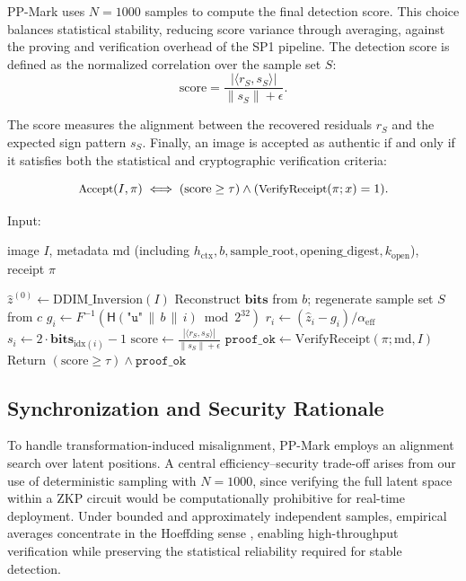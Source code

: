 \documentclass{article}
\theoremstyle{plain}
\theoremstyle{definition}
\theoremstyle{remark}
\begin{document}
PP-Mark uses \(N = 1000\) samples to compute the final detection score. This choice balances
statistical stability, reducing score variance through averaging, against the proving and
verification overhead of the SP1 pipeline. The detection score is defined as the normalized
correlation over the sample set \(S\):
\begin{equation}
\mathrm{score}
= \frac{|\langle r_S, s_S \rangle|}{\|s_S\| + \epsilon}.
\end{equation}

The score measures the alignment between the recovered residuals \(r_S\) and the expected
sign pattern \(s_S\). Finally, an image is accepted as authentic if and only if it satisfies
both the statistical and cryptographic verification criteria:

\begin{equation}
{\small
\text{Accept}(I,\pi)\iff (\mathrm{score}\ge\tau)\land(\text{VerifyReceipt}(\pi; x)=1).
}
\end{equation}


\begin{algorithm}[t]
\caption{Verify and Extract}
\label{alg:verify}
\begin{algorithmic}[1]
\STATE Input:
\parbox[t]{0.85\linewidth}{
image \(I\), metadata \(\mathrm{md}\) (including \(h_{\mathrm{ctx}}, b,
\mathrm{sample\_root}, \mathrm{opening\_digest}, k_{\mathrm{open}}\)), receipt \(\pi\)
}
\STATE \(\hat{z}^{(0)} \leftarrow \text{DDIM\_Inversion}(I)\)
\STATE Reconstruct \(\mathbf{bits}\) from \(b\); regenerate sample set \(S\) from \(c\)
  \STATE \(g_i \leftarrow F^{-1}(\mathsf{H}(\texttt{"u"} \,\|\, b \,\|\, i) \bmod 2^{32})\)
  \STATE \(r_i \leftarrow (\hat{z}_i - g_i) / \alpha_{\mathrm{eff}}\)
  \STATE \(s_i \leftarrow 2 \cdot \mathbf{bits}_{\mathrm{idx}(i)} - 1\)
\ENDFOR
\STATE \(\mathrm{score} \leftarrow \frac{|\langle r_S, s_S \rangle|}{\|s_S\| + \epsilon}\)
\STATE \(\texttt{proof\_ok} \leftarrow \text{VerifyReceipt}(\pi; \mathrm{md}, I)\)
\STATE Return \((\mathrm{score} \ge \tau) \land \texttt{proof\_ok}\)
\end{algorithmic}
\end{algorithm}

  
\subsection{Synchronization and Security Rationale}
To handle transformation-induced misalignment, PP-Mark employs an alignment search over
latent positions. A central efficiency--security trade-off arises from our use of
deterministic sampling with \(N=1000\), since verifying the full latent space within a ZKP
circuit would be computationally prohibitive for real-time deployment. Under bounded and
approximately independent samples, empirical averages concentrate in the Hoeffding sense
\cite{hoeffding1963}, enabling high-throughput verification while preserving the
statistical reliability required for stable detection.
\end{document}
